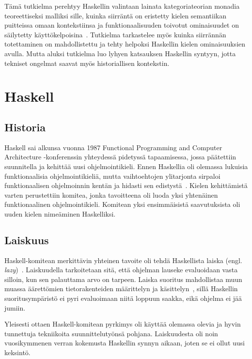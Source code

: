 \documentclass[finnish]{tktltiki2}
\begin{document}
Tämä tutkielma perehtyy Haskellin valintaan lainata kategoriateorian monadia teoreettiseksi malliksi
sille, kuinka siirräntä on eristetty kielen semantiikan puitteissa omaan kontekstiinsa ja
funktionaalisuuden toivotut ominaisuudet on säilytetty käyttökelpoisina~\cite{ifp93}. Tutkielma
tarkastelee myös kuinka siirrännän totettaminen on mahdollistettu ja tehty helpoksi Haskellin kielen
ominaisuuksien avulla. Mutta aluksi tutkielma luo lyhyen katsauksen Haskellin syntyyn, jotta
tekniset ongelmat saavat myös historiallisen kontekstin.


\section{Haskell}

\subsection{Historia}

Haskell sai alkunsa vuonna 1987 Functional Programming and Computer Architecture -konferenssin
yhteydessä pidetyssä tapaamisessa, jossa päätettiin suunnitella ja kehittää uusi ohjelmointikieli.
Ennen Haskellia oli olemassa lukuisia funktionaalisia ohjelmointikieliä, mutta vaihtoehtojen
ylitarjonta sirpaloi funktionaalisen ohjelmoinnin kentän ja hidasti sen edistystä~\cite{hoh07}.
Kielen kehittämistä varten perustettiin komitea, jonka tavoitteena oli luoda yksi yhtenäinen
funktionaalinen ohjelmointikieli. Komitean yksi ensimmäisistä saavutuksista oli uuden kielen
nimeäminen Haskelliksi.

\subsection{Laiskuus}
\label{subsec:laiskuus}

Haskell-komitean merkittävin yhteinen tavoite oli tehdä Haskellista laiska (engl.
\emph{lazy})~\cite{hoh07}. Laiskuudella tarkoitetaan sitä, että ohjelman lauseke evaluoidaan vasta
silloin, kun sen palauttama arvo on tarpeen. Laiska suoritus mahdollistaa muun muassa äärettömien
tietorakenteiden määrittelyn ja käsittelyn~\cite{cons76}, sillä Haskellin suoritusympäristö ei pyri
evaluoimaan niitä loppuun saakka, eikä ohjelma ei jää jumiin.

Yleisesti ottaen Haskell-komitean pyrkimys oli käyttää olemassa olevia ja hyvin tunnettuja
tekniikoita suunnittelutyönsä pohjana. Laiskuudesta oli noin vuosikymmenen verran kokemusta
Haskellin synnyn aikaan, joten se ei ollut uusi keksintö.
\end{document}
